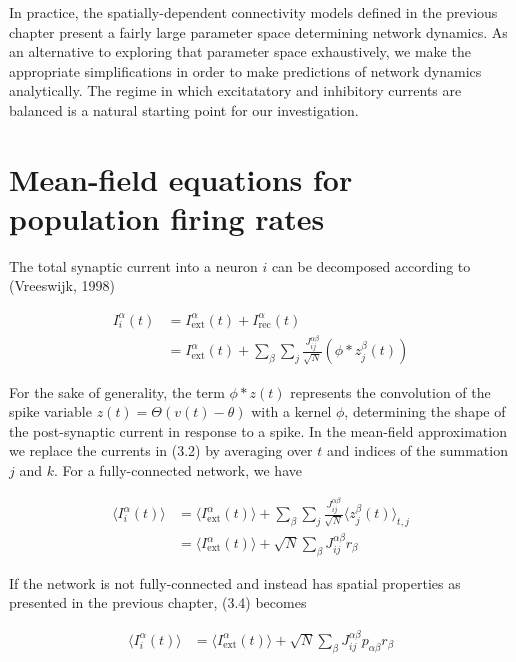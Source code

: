 \documentclass{ucetd}
\begin{document}
In practice, the spatially-dependent connectivity models defined in the previous chapter present a fairly large parameter space determining network dynamics. As an alternative to exploring that parameter space exhaustively, we make the appropriate simplifications in order to make predictions of network dynamics analytically. The regime in which excitatatory and inhibitory currents are balanced is a natural starting point for our investigation.

\section{Mean-field equations for population firing rates}

The total synaptic current into a neuron $i$ can be decomposed according to (Vreeswijk, 1998)

\begin{align}
I_{i}^{\alpha}(t) &= I_{\mathrm{ext}}^{\alpha}(t) + I_{\mathrm{rec}}^{\alpha}(t)\\
&= I_{\mathrm{ext}}^{\alpha}(t) + \sum_{\beta}\sum_{j} \frac{J_{ij}^{\alpha\beta}}{\sqrt{N}}(\phi * z^{\beta}_{j}(t))
\end{align}

For the sake of generality, the term $\phi * z(t)$ represents the convolution of the spike variable $z(t) = \Theta(v(t) - \theta)$ with a kernel $\phi$, determining the shape of the post-synaptic current in response to a spike. In the mean-field approximation we replace the currents in (3.2) by averaging over $t$ and indices of the summation $j$ and $k$. For a fully-connected network, we have

\begin{align}
\langle I_{i}^{\alpha}(t)\rangle &= \langle I_{\mathrm{ext}}^{\alpha}(t)\rangle + \sum_{\beta}\sum_{j} \frac{J_{ij}^{\alpha\beta}}{\sqrt{N}}\langle z_{j}^{\beta}(t)\rangle_{t,j}\\
&= \langle I_{\mathrm{ext}}^{\alpha}(t)\rangle + \sqrt{N}\sum_{\beta}J_{ij}^{\alpha\beta} r_{\beta}
\end{align}

If the network is not fully-connected and instead has spatial properties as presented in the previous chapter, (3.4) becomes

\begin{align}
\langle I_{i}^{\alpha}(t)\rangle &= \langle I_{\mathrm{ext}}^{\alpha}(t)\rangle + \sqrt{N}\sum_{\beta}J_{ij}^{\alpha\beta}p_{\alpha\beta}r_{\beta}
\end{align}
\end{document}
